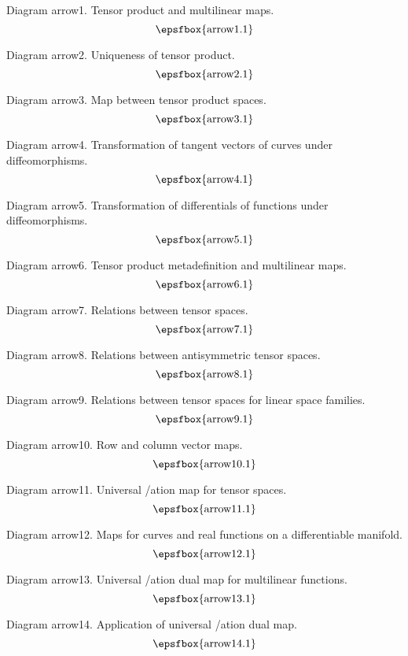 \def\secteject{\vfill\eject}
\def\filleject{\vfill\eject}

\vskip2mm
\edef\SECTarrow{\the\pageno}

Diagram arrow1. Tensor product and multilinear maps.
$$
\centerline{\epsfbox{arrow1.1}}
$$

Diagram arrow2. Uniqueness of tensor product.
$$
\centerline{\epsfbox{arrow2.1}}
$$

Diagram arrow3. Map between tensor product spaces.
$$
\centerline{\epsfbox{arrow3.1}}
$$

Diagram arrow4. Transformation of tangent vectors of curves under
diffeomorphisms.
$$
\centerline{\epsfbox{arrow4.1}}
$$

Diagram arrow5. Transformation of differentials of functions under
diffeomorphisms.
$$
\centerline{\epsfbox{arrow5.1}}
$$

\filleject

Diagram arrow6. Tensor product metadefinition and multilinear maps.
$$
\centerline{\epsfbox{arrow6.1}}
$$

Diagram arrow7. Relations between tensor spaces.
$$
\centerline{\epsfbox{arrow7.1}}
$$

Diagram arrow8. Relations between antisymmetric tensor spaces.
$$
\centerline{\epsfbox{arrow8.1}}
$$

Diagram arrow9. Relations between tensor spaces for linear space families.
$$
\centerline{\epsfbox{arrow9.1}}
$$

Diagram arrow10. Row and column vector maps.
$$
\centerline{\epsfbox{arrow10.1}}
$$

Diagram arrow11. Universal \factoris/ation map for tensor spaces.
$$
\centerline{\epsfbox{arrow11.1}}
$$

\filleject

Diagram arrow12. Maps for curves and real functions on a differentiable
manifold.
$$
\centerline{\epsfbox{arrow12.1}}
$$

Diagram arrow13. Universal \factoris/ation dual map for multilinear functions.
$$
\centerline{\epsfbox{arrow13.1}}
$$

Diagram arrow14. Application of universal \factoris/ation dual map.
$$
\centerline{\epsfbox{arrow14.1}}
$$

